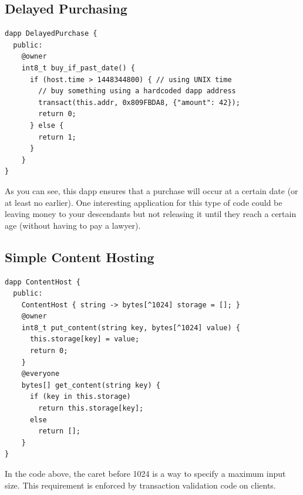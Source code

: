 \documentclass[letterpaper]{article}
\begin{document}
\subsection{Delayed Purchasing}
\begin{lstlisting}
dapp DelayedPurchase {
  public:
    @owner
    int8_t buy_if_past_date() {
      if (host.time > 1448344800) { // using UNIX time
        // buy something using a hardcoded dapp address
        transact(this.addr, 0x809FBDA8, {"amount": 42});
        return 0;
      } else {
        return 1;
      }
    }
}
\end{lstlisting}
As you can see, this dapp ensures that a purchase will occur at a certain date (or at least no earlier). One interesting application for this type of code could be leaving money to your descendants but not releasing it until they reach a certain age (without having to pay a lawyer).
\newline

\subsection{Simple Content Hosting}
\begin{lstlisting}
dapp ContentHost {
  public:
    ContentHost { string -> bytes[^1024] storage = []; }
    @owner
    int8_t put_content(string key, bytes[^1024] value) {
      this.storage[key] = value;
      return 0;
    }
    @everyone
    bytes[] get_content(string key) {
      if (key in this.storage)
        return this.storage[key];
      else
        return [];
    }
}
\end{lstlisting}
In the code above, the caret before 1024 is a way to specify a maximum input size. This requirement is enforced by transaction validation code on clients.
\newline
\end{document}
